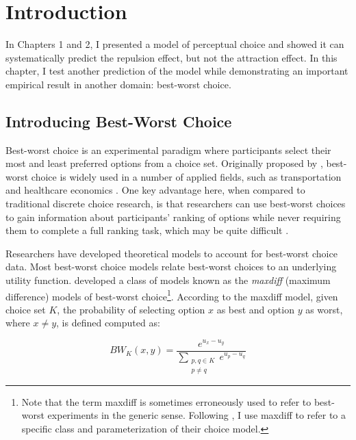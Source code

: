 \section{Introduction}

In Chapters 1 and 2, I presented a model of perceptual choice and showed it can systematically predict the repulsion effect, but not the attraction effect. In this chapter, I test another prediction of the model while demonstrating an important empirical result in another domain: best-worst choice.

\subsection{Introducing Best-Worst Choice}

Best-worst choice is an experimental paradigm where participants select their most and least preferred options from a choice set. Originally proposed by \textcite{finn1992determining}, best-worst choice is widely used in a number of applied fields, such as transportation \parencite{beck2016best} and healthcare economics \parencite{cheung2016using,flynn2007best,muhlbacher2016experimental}. One key advantage here, when compared to traditional discrete choice research, is that researchers can use best-worst choices to gain information about participants' ranking of options while never requiring them to complete a full ranking task, which may be quite difficult \parencite{marleyProbabilisticModelsBest2005}.

Researchers have developed theoretical models to account for best-worst choice data. Most best-worst choice models relate best-worst choices to an underlying utility function. \textcite{marleyProbabilisticModelsBest2005} developed a class of models known as the \textit{maxdiff} (maximum difference) models of best-worst choice\footnote{Note that the term maxdiff is sometimes erroneously used to refer to best-worst experiments in the generic sense. Following \textcite{marleyProbabilisticModelsBest2005}, I use maxdiff to refer to a specific class and parameterization of their choice model.}. According to the maxdiff model, given choice set $K$, the probability of selecting option $x$ as best and option $y$ as worst, where $x \neq y$, is defined computed as:

\begin{equation}
   BW_{K}(x,y)=\frac{e^{u_{x}-u_{y}}}{\sum_{\substack{{p,q}\in K\\p \neq q}} e^{u_{p}-u_{q}}}   
   \label{eqn:maxdiff_equation}
\end{equation}

